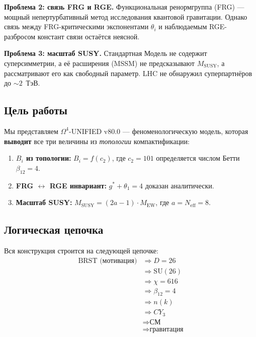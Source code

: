 \documentclass[11pt,a4paper]{article}
\newcommand{\SU}{\ensuremath{\mathrm{SU}}}
\newcommand{\CY}{\ensuremath{CY_3}}
\newcommand{\Om}{\ensuremath{\Omega^4}}
\newcommand{\gstar}{\ensuremath{g^*}}
\newcommand{\Neff}{\ensuremath{N_{\text{eff}}}}
\newcommand{\MEW}{\ensuremath{M_{\text{EW}}}}
\newcommand{\MSUSY}{\ensuremath{M_{\text{SUSY}}}}
\newcommand{\cTwo}{\ensuremath{c_2}}
\theoremstyle{definition}
\begin{document}
\medskip\noindent
\textbf{Проблема 2: связь FRG и RGE.}
Функциональная ренормгруппа (FRG) --- мощный непертурбативный метод
исследования квантовой гравитации. Однако связь между
FRG-критическими экспонентами $\theta_i$ и наблюдаемым RGE-разбросом
констант связи остаётся неясной.

\medskip\noindent
\textbf{Проблема 3: масштаб SUSY.}
Стандартная Модель не содержит суперсимметрии, а её расширения
(MSSM) не предсказывают $\MSUSY$, а рассматривают его как
свободный параметр. LHC не обнаружил суперпартнёров до $\sim 2$~ТэВ.

\subsection{Цель работы}

Мы представляем $\Om$-UNIFIED v80.0 --- феноменологическую модель,
которая \textbf{выводит} все три величины из \emph{топологии}
компактификации:

\begin{enumerate}
    \item \textbf{$B_i$ из топологии:} $B_i = f(\cTwo)$, где
          $\cTwo = 101$ определяется числом Бетти $\beta_{12} = 4$.
    \item \textbf{FRG $\leftrightarrow$ RGE инвариант:}
          $\gstar + \theta_1 = 4$ доказан аналитически.
    \item \textbf{Масштаб SUSY:} $\MSUSY = (2a-1) \cdot \MEW$,
          где $a = \Neff = 8$.
\end{enumerate}

\subsection{Логическая цепочка}

Вся конструкция строится на следующей цепочке:
\begin{equation}
    \boxed{
    \begin{aligned}
        \text{BRST (мотивация)} &\Rightarrow D = 26 \\
        &\Rightarrow \SU(26) \\
        &\Rightarrow \chi = 616 \\
        &\Rightarrow \beta_{12} = 4 \\
        &\Rightarrow n(k) \\
        &\Rightarrow \CY \\
        &\Rightarrow \text{СМ} \\
        &\Rightarrow \text{гравитация}
    \end{aligned}}
    \label{eq:logic-chain}
\end{equation}
\end{document}
